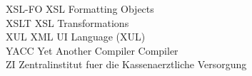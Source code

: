 \begin{tabbing}
    \>XSL-FO \>\>XSL Formatting Objects\\

    \>XSLT \>\>XSL Transformations\\

    \>XUL \>\>XML UI Language (XUL)\\

    \>YACC \>\>Yet Another Compiler Compiler\\


    \>ZI \>\>Zentralinstitut fuer die Kassenaerztliche Versorgung\\
\end{tabbing}
